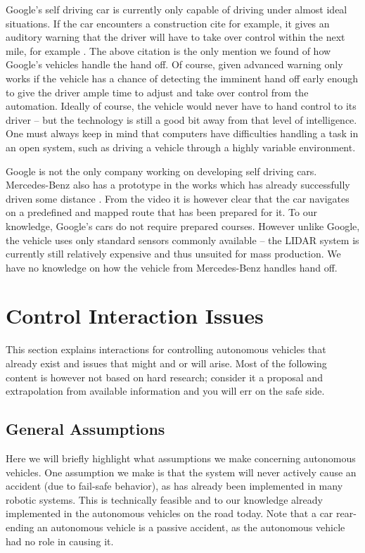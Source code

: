 \documentclass{acm_proc_article-sp}
\begin{document}
Google's self driving car is currently only capable of driving under almost ideal situations.
If the car encounters a construction cite for example, it gives an auditory warning that the driver will have to take over control within the next mile, for example \cite{www:newyorker_google_car}.
The above citation is the only mention we found of how Google's vehicles handle the hand off.
Of course, given advanced warning only works if the vehicle has a chance of detecting the imminent hand off early enough to give the driver ample time to adjust and take over control from the automation.
Ideally of course, the vehicle would never have to hand control to its driver – but the technology is still a good bit away from that level of intelligence.
One must always keep in mind that computers have difficulties handling a task in an open system, such as driving a vehicle through a highly variable environment.

Google is not the only company working on developing self driving cars.
Mercedes-Benz also has a prototype in the works which has already successfully driven some distance \cite{www:mercedes_autonomous}.
From the video it is however clear that the car navigates on a predefined and mapped route that has been prepared for it.
To our knowledge, Google's cars do not require prepared courses.
However unlike Google, the vehicle uses only standard sensors commonly available – the LIDAR system is currently still relatively expensive and thus unsuited for mass production.
We have no knowledge on how the vehicle from Mercedes-Benz handles hand off.

\section{Control Interaction Issues}

This section explains interactions for controlling autonomous vehicles that already exist and issues that might and or will arise.
Most of the following content is however not based on hard research; consider it a proposal and extrapolation from available information and you will err on the safe side.

\subsection{General Assumptions}

Here we will briefly highlight what assumptions we make concerning autonomous vehicles.
One assumption we make is that the system will never actively cause an accident (due to fail-safe behavior), as has already been implemented in many robotic systems.
This is technically feasible and to our knowledge already implemented in the autonomous vehicles on the road today.
Note that a car rear-ending an autonomous vehicle is a passive accident, as the autonomous vehicle had no role in causing it.
\end{document}

